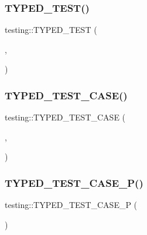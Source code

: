 \mbox{\label{namespacetesting_a400c572f732b06e836d6b3a5adfc4cf7}} 
\subsubsection{\texorpdfstring{TYPED\_TEST()}{TYPED\_TEST()}}
{\footnotesize\ttfamily testing\+::\+T\+Y\+P\+E\+D\+\_\+\+T\+E\+ST (\begin{DoxyParamCaption}\item[{\mbox{\hyperlink{classtesting_1_1CodeLocationForTYPEDTEST}{Code\+Location\+For\+T\+Y\+P\+E\+D\+T\+E\+ST}}}]{,  }\item[{Verify}]{ }\end{DoxyParamCaption})}

\mbox{\label{namespacetesting_af0459cc6cdfbbae821caf802c7f2bb72}} 
\subsubsection{\texorpdfstring{TYPED\_TEST\_CASE()}{TYPED\_TEST\_CASE()}}
{\footnotesize\ttfamily testing\+::\+T\+Y\+P\+E\+D\+\_\+\+T\+E\+S\+T\+\_\+\+C\+A\+SE (\begin{DoxyParamCaption}\item[{\mbox{\hyperlink{classtesting_1_1CodeLocationForTYPEDTEST}{Code\+Location\+For\+T\+Y\+P\+E\+D\+T\+E\+ST}}}]{,  }\item[{int}]{ }\end{DoxyParamCaption})}

\mbox{\label{namespacetesting_a439eefbc85668f74fd9e0c2cb7c7d0b0}} 
\subsubsection{\texorpdfstring{TYPED\_TEST\_CASE\_P()}{TYPED\_TEST\_CASE\_P()}}
{\footnotesize\ttfamily testing\+::\+T\+Y\+P\+E\+D\+\_\+\+T\+E\+S\+T\+\_\+\+C\+A\+S\+E\+\_\+P (\begin{DoxyParamCaption}\item[{\mbox{\hyperlink{classtesting_1_1CodeLocationForTYPEDTESTP}{Code\+Location\+For\+T\+Y\+P\+E\+D\+T\+E\+S\+TP}}}]{ }\end{DoxyParamCaption})}

